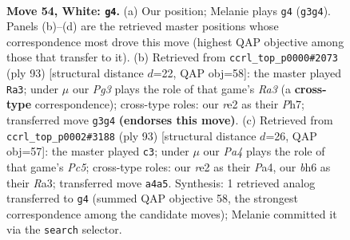 \documentclass[11pt]{article}
\begin{document}
\clearpage

\begin{figure}[p]\centering
\begin{subfigure}{0.46\textwidth}\centering
\resizebox{\linewidth}{!}{%
\newchessgame
\chessboard[
  setfen={8/1p1r3k/5Kpb/5p1p/P7/6PP/4r3/8 w - - 0 54},
  showmover=false,
  pgfstyle=straightmove, color=movearrow, markmove={g3-g4}
]}
\caption{}
\end{subfigure}\hfill
\begin{subfigure}{0.46\textwidth}\centering
\resizebox{\linewidth}{!}{%
\newchessgame
\chessboard[
  setfen={8/7p/r7/6p1/3Pk3/4P1P1/3R1K2/8 b - - 4 47},
  showmover=false,
  pgfstyle=straightmove, color=movearrow, markmove={a6-a3}
]}
\caption{}
\end{subfigure}
\\[4pt]
\begin{subfigure}{0.46\textwidth}\centering
\resizebox{\linewidth}{!}{%
\newchessgame
\chessboard[
  setfen={8/6R1/7p/4kP1P/p1p1P1K1/r7/5P2/8 b - - 0 47},
  showmover=false,
  pgfstyle=straightmove, color=movearrow, markmove={c4-c3}
]}
\caption{}
\end{subfigure}\hfill

\caption{\textbf{Move 54, White: \texttt{g4}.} (a) Our position; Melanie plays \texttt{g4} (\texttt{g3g4}). Panels (b)--(d) are the retrieved master positions whose correspondence most drove this move (highest QAP objective among those that transfer to it). (b) Retrieved from \texttt{ccrl\_top\_p0000\#2073} (ply 93) [structural distance $d$=22, QAP obj=58]: the master played \texttt{Ra3}; under $\mu$ our \emph{Pg3} plays the role of that game's \emph{Ra3} (a \textbf{cross-type} correspondence); cross-type roles: our \emph{r}e2 as their \emph{P}h7; transferred move \texttt{g3g4} \textbf{(endorses this move)}. (c) Retrieved from \texttt{ccrl\_top\_p0002\#3188} (ply 93) [structural distance $d$=26, QAP obj=57]: the master played \texttt{c3}; under $\mu$ our \emph{Pa4} plays the role of that game's \emph{Pc5}; cross-type roles: our \emph{r}e2 as their \emph{P}a4, our \emph{b}h6 as their \emph{R}a3; transferred move \texttt{a4a5}. Synthesis: 1 retrieved analog transferred to \texttt{g4} (summed QAP objective 58, the strongest correspondence among the candidate moves); Melanie committed it via the \texttt{search} selector.}
\label{fig:thought-m106}
\end{figure}

\clearpage
\end{document}
